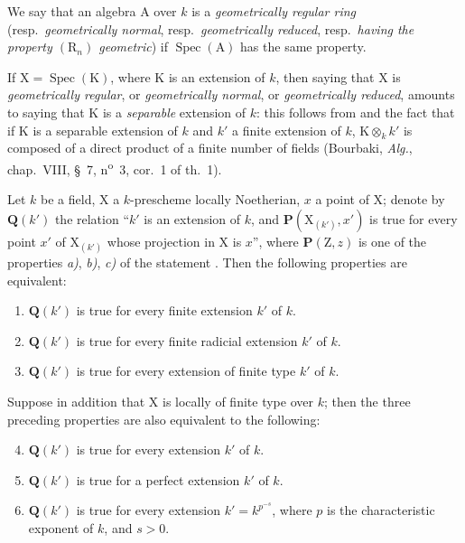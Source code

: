 We say that an algebra $\mathrm{A}$ over $k$ is a \emph{geometrically regular ring} (resp.\ \emph{geometrically normal}, resp.\ \emph{geometrically reduced}, resp.\ \emph{having the property $(\mathrm{R}_n)$ geometric}) if $\operatorname{Spec}(\mathrm{A})$ has the same property.

If $\mathrm{X}=\operatorname{Spec}(\mathrm{K})$, where $\mathrm{K}$ is an extension of $k$, then saying that $\mathrm{X}$ is \emph{geometrically regular}, or \emph{geometrically normal}, or \emph{geometrically reduced}, amounts to saying that $\mathrm{K}$ is a \emph{separable} extension of $k$: this follows from  and the fact that if $\mathrm{K}$ is a separable extension of $k$ and $k'$ a finite extension of $k$, $\mathrm{K}\otimes_k k'$ is composed of a direct product of a finite number of fields (Bourbaki, \emph{Alg.}, chap.~VIII, \S~7, n\textsuperscript{o}~3, cor.~1 of th.~1).


\begin{proposition}[6.7.7]
\label{IV.6.7.7}
Let $k$ be a field, $\mathrm{X}$ a $k$-prescheme locally Noetherian, $x$ a point of $\mathrm{X}$; denote by $\boldsymbol{Q}(k')$ the relation ``$k'$ is an extension of $k$, and $\boldsymbol{P}(\mathrm{X}_{(k')},x')$ is true for every point $x'$ of $\mathrm{X}_{(k')}$ whose projection in $\mathrm{X}$ is $x$'', where $\boldsymbol{P}(\mathrm{Z},z)$ is one of the properties \emph{a)}, \emph{b)}, \emph{c)} of the statement . Then the following properties are equivalent:
\begin{enumerate}[label=\emph{\alph*)}]
  \item $\boldsymbol{Q}(k')$ is true for every finite extension $k'$ of $k$.
  \item $\boldsymbol{Q}(k')$ is true for every finite radicial extension $k'$ of $k$.
  \item $\boldsymbol{Q}(k')$ is true for every extension of finite type $k'$ of $k$.
\end{enumerate}
Suppose in addition that $\mathrm{X}$ is locally of finite type over $k$; then the three preceding properties are also equivalent to the following:
\begin{enumerate}[label=\emph{\alph*)}]
\setcounter{enumi}{3}
  \item $\boldsymbol{Q}(k')$ is true for every extension $k'$ of $k$.
  \item $\boldsymbol{Q}(k')$ is true for \textup{a} perfect extension $k'$ of $k$.
  \item $\boldsymbol{Q}(k')$ is true for every extension $k'=k^{p^{-s}}$, where $p$ is the characteristic exponent of $k$, and $s>0$.
\end{enumerate}
\end{proposition}

